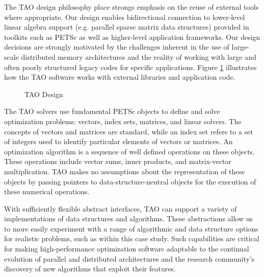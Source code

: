 
The TAO design philosophy place strongs emphasis on the reuse of
external tools where appropriate.  Our design enables bidirectional
connection to lower-level linear algebra support (e.g. parallel sparse
matrix data structures) provided in toolkits such as PETSc
\cite{petsc} \cite{petsc-user-ref,petsc-web-page}
as well as higher-level application
frameworks.  Our design decisions are strongly motivated by the
challenges inherent in the use of large-scale distributed memory
architectures and the reality of working with large and often poorly
structured legacy codes for specific applications.  Figure
\ref{tao:design} illustrates how the TAO software works with external
libraries and application code.


\begin{figure}
\centerline{\epsfysize=3.5in }
\caption{TAO Design}
\label{tao:design}
\end{figure}


The TAO solvers use fundamental PETSc objects to define and solve
optimization problems: vectors, index sets, matrices, and linear
solvers.  The concepts of vectors and matrices are standard, while an
index set refers to a set of integers used to identify particular
elements of vectors or matrices.  An optimization algorithm is a
sequence of well defined operations on these objects.  These
operations include vector sums, inner products, and matrix-vector
multiplication.  TAO makes no assumptions about the representation of
these objects by passing pointers to data-structure-neutral objects
for the execution of these numerical operations.

With sufficiently flexible abstract interfaces, TAO can support a
variety of implementations of data structures and algorithms.  These
abstractions allow us to more easily experiment with a range of
algorithmic and data structure options for realistic problems, such as
within this case study.  Such capabilities are critical for making
high-performance optimization software adaptable to the continual
evolution of parallel and distributed architectures and the research
community's discovery of new algorithms that exploit their features.


